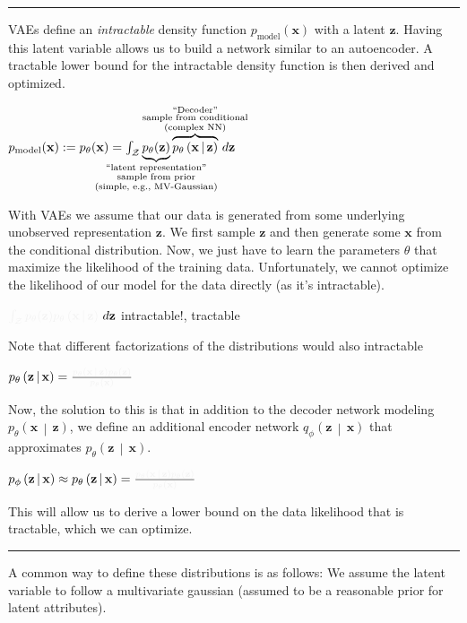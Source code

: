 \documentclass[a2paper,8pt]{extarticle}
\makeatletter
\newcommand{\tcr}[1]{\textcolor{lighttext}{#1}}
\newcommand{\tcg}[1]{\textcolor{lighttext}{#1}}
\newcommand{\tcr}[1]{\textcolor{red}{#1}}
\newcommand{\tcg}[1]{\textcolor{green}{#1}}
\def\mc#1#{\@mc{#1}}
\def\@mc#1#2#3{%
  \protect\leavevmode
  \begingroup
    \color#1{#2}#3%
  \endgroup
}
\newcommand{\mcr}[1]{\mc{lighttext}{#1}}
\newcommand{\mcg}[1]{\mc{lighttext}{#1}}
\newcommand{\mcr}[1]{\mc{red}{#1}}
\newcommand{\mcg}[1]{\mc{green}{#1}}
\newcommand{\cZ}{\mathcal{Z}}
\newcommand{\Dist}[2]{#1\left( #2 \right)}
\newcommand{\cDist}[3]{#1\left( #2 \,\middle|\, #3 \right)}
\renewcommand{\vec}[1]{\mathbf{#1}}
\newcommand{\vx}{\vec{x}}
\newcommand{\vz}{\vec{z}}
\newcommand{\sep}{\vspace{0pt}\noindent\hrule\vspace{0pt}}
\newcommand{\sep}{\vspace{5pt}\noindent\hrule\vspace{5pt}}
\makeatother
\begin{document}
\begin{landscape}
\begin{multicols*}{7}
\sep

VAEs define an \emph{intractable} density function $p_{\text{model}}(\vx)$ with
a latent $\vz$. Having this latent variable allows us to build a network
similar to an autoencoder. A tractable lower bound for the intractable density
function is then derived and optimized.

$
p_{\text{model}}(\vx):=
p_\theta(\vx)=\int_{\cZ}
\underbrace{p_\theta(\vz)}_{\mathclap{\substack{
\text{``latent representation''}\\
\text{sample from prior}\\
\text{(simple, e.g., MV-Gaussian)}}}}
\overbrace{\cDist{p_\theta}{\vx}{\vz}}^{\mathclap{\substack{
\text{``Decoder''}\\
\text{sample from conditional}\\
\text{(complex NN)}}}} \,d\vz 
$

With VAEs we assume that our data is generated from some underlying unobserved
representation $\vz$. We first sample $\vz$ and then generate some $\vx$ from
the conditional distribution. Now, we just have to learn the parameters $\theta$
that maximize the likelihood of the training data. Unfortunately, we cannot
optimize the likelihood of our model for the data directly (as it's
intractable). 

$\mcr{\int_{\cZ}} \mcg{p_\theta(\vz)}\mcg{\cDist{p_\theta}{\vx}{\vz}} \,d\vz$
\quad\tcr{intractable!}, \tcg{tractable}

Note that different factorizations of the distributions would also intractable

$\cDist{p_\theta}{\vz}{\vx}=\frac{\tcg{\cDist{p_\theta}{\vx}{\vz}
\Dist{p_\theta}{\vz}}}{\tcr{\Dist{p_\theta}{\vx}}}$

Now, the solution to this is that in addition to the decoder network modeling
$\cDist{p_\theta}{\vx}{\vz}$, we define an additional encoder network
$\cDist{q_\phi}{\vz}{\vx}$ that approximates $\cDist{p_\theta}{\vz}{\vx}$.

$
\cDist{p_\phi}{\vz}{\vx}
\approx
\cDist{p_\theta}{\vz}{\vx}=\frac{\tcg{\cDist{p_\theta}{\vx}{\vz}
\Dist{p_\theta}{\vz}}}{\tcr{\Dist{p_\theta}{\vx}}}
$

This will allow us to derive a lower bound on the data likelihood that is
tractable, which we can optimize.

\sep

A common way to define these distributions is as follows: We assume the latent
variable to follow a multivariate gaussian (assumed to be a reasonable prior for
latent attributes).


\end{multicols*}
\end{landscape}
\end{document}
